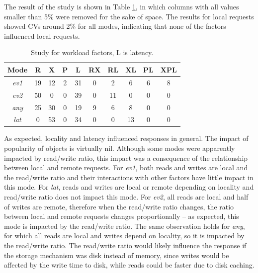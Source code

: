 \documentclass[doublespacing]{bmcart}
\begin{document}
The result of the study is shown in Table
\ref{tab:estudo_para_fatores_de_carga_de_trabalho}, in which columns with all
values smaller than 5\% were removed for the sake of space. The results for
local requests showed CVs around 2\% for all modes, indicating that none of the
factors influenced local requests.

\begin{table}[h!]
\caption{Study for workload factors, L is latency.}
\begin{tabular}{cccccccccc} \hline

Mode & R & X & P & L & RX & RL & XL & PL & XPL\\\hline

\textit{ev1} & 19 & 12 & 2 & 31 & 0 & 2 & 6 & 6 & 8\\

\textit{ev2} & 50 & 0 & 0 & 39 & 0 & 11 & 0 & 0 & 0\\

\textit{any} & 25 & 30 & 0 & 19 & 9 & 6 & 8 & 0 & 0\\

\textit{lat} & 0 & 53 & 0 & 34 & 0 & 0 & 13 & 0 & 0\\\hline

\end{tabular} 
\label{tab:estudo_para_fatores_de_carga_de_trabalho}
\end{table}

As expected, locality and latency influenced responses in general. The impact
of popularity of objects is virtually nil. Although some modes were apparently
impacted by read/write ratio, this impact was a consequence of the relationship
between local and remote requests. For \textit{ev1}, both reads and writes are
local and the read/write ratio and their interactions with other factors have
little impact in this mode. For \textit{lat}, reads and writes are local or
remote depending on locality and read/write ratio does not impact this mode.
For \textit{ev2}, all reads are local and half of writes are remote, therefore
when the read/write ratio changes, the ratio between local and remote requests
changes proportionally -- as expected, this mode is impacted by the read/write
ratio. The same observation holds for \textit{any}, for which all reads are
local and writes depend on locality, so it is impacted by the read/write ratio.
The read/write ratio would likely influence the response if the storage
mechanism was disk instead of memory, since writes would be affected by the
write time to disk, while reads could be faster due to disk caching.
\end{document}
